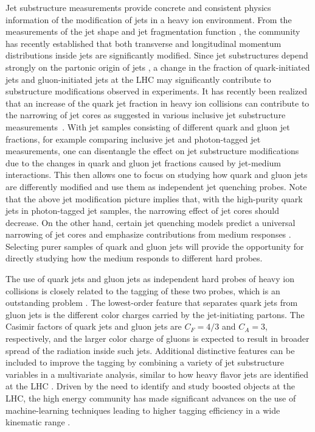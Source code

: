 \documentclass[notoc,preprintnumbers]{JHEP3}
\begin{document}
Jet substructure measurements provide concrete and consistent physics information of the modification of jets in a heavy ion environment. From the measurements of the jet shape \cite{Ellis:1992qq,Chatrchyan:2013kwa,Khachatryan:2016tfj,Seymour:1997kj,Li:2011hy,Li:2012bw,Vitev:2008rz,Vitev:2009rd} and jet fragmentation function \cite{Procura:2009vm,Chatrchyan:2012gw,Aad:2014wha,Chatrchyan:2014ava,Aaboud:2017bzv,Sirunyan:2018qec}, the community has recently established that both transverse and longitudinal momentum distributions inside jets are significantly modified. Since jet substructures depend strongly on the partonic origin of jets \cite{Gallicchio:2011xq,Gallicchio:2012ez,Chien:2012ur,Chien:2015ctp,Chien:2014nsa}, a change in the fraction of quark-initiated jets and gluon-initiated jets at the LHC may significantly contribute to substructure modifications observed in experiments. It has recently been realized that an increase of the quark jet fraction in heavy ion collisions can contribute to the narrowing of jet cores as suggested in various inclusive jet substructure measurements~\cite{Chien:2015hda,Spousta:2015fca}. With jet samples consisting of different quark and gluon jet fractions, for example comparing inclusive jet and photon-tagged jet measurements, one can disentangle the effect on jet substructure modifications due to the changes in quark and gluon jet fractions caused by jet-medium interactions. This then allows one to focus on studying how quark and gluon jets are differently modified and use them as independent jet quenching probes. Note that the above jet modification picture implies that, with the high-purity quark jets in photon-tagged jet samples, the narrowing effect of jet cores should decrease. On the other hand, certain jet quenching models predict a universal narrowing of jet cores \cite{KunnawalkamElayavalli:2017hxo,Milhano:2017nzm,Casalderrey-Solana:2016jvj,Brewer:2017fqy} and emphasize contributions from medium responses \cite{Tachibana:2017syd}. Selecting purer samples of quark and gluon jets will provide the opportunity for directly studying how the medium responds to different hard probes.

The use of quark jets and gluon jets as independent hard probes of heavy ion collisions is closely related to the tagging of these two probes, which is an outstanding problem \cite{Gras:2017jty,Frye:2017yrw}. The lowest-order feature that separates quark jets from gluon jets is the different color charges carried by the jet-initiating partons. The Casimir factors of quark jets and gluon jets are $C_F = 4/3$ and $C_A=3$, respectively, and the larger color charge of gluons is expected to result in broader spread of the radiation inside such jets. Additional distinctive features can be included to improve the tagging by combining a variety of jet substructure variables in a multivariate analysis, similar to how heavy flavor jets are identified at the LHC \cite{Chatrchyan:2012jua, Aad:2015ydr}. Driven by the need to identify and study boosted objects at the LHC, the high energy community has made significant advances on the use of machine-learning techniques leading to higher tagging efficiency in a wide kinematic range \cite{Komiske:2016rsd, Larkoski:2017jix}.
\end{document}

